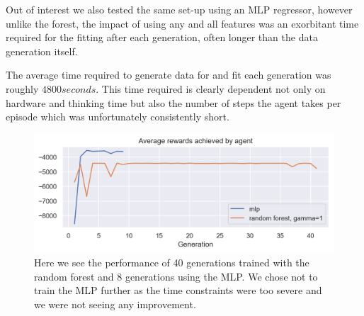 Out of interest we also tested the same set-up using an MLP regressor, however unlike the forest, the impact of using any and all features was an exorbitant time required for the fitting after each generation, often longer than the data generation itself.

The average time required to generate data for and fit each generation was roughly $4800 seconds$. This time required is clearly dependent not only on hardware and thinking time but also the number of steps the agent takes per episode which was unfortunately consistently short.

\begin{figure}[h]
\centering
	\includegraphics[width=\linewidth]{images/mlp_vs_forest_gamma_1.png}
	\caption{Here we see the performance of 40 generations trained with the random forest and 8 generations using the MLP. We chose not to train the MLP further as the time constraints were too severe and we were not seeing any improvement.}
	\label{mlp_vs_forest_gamma_1.0}
\end{figure}



